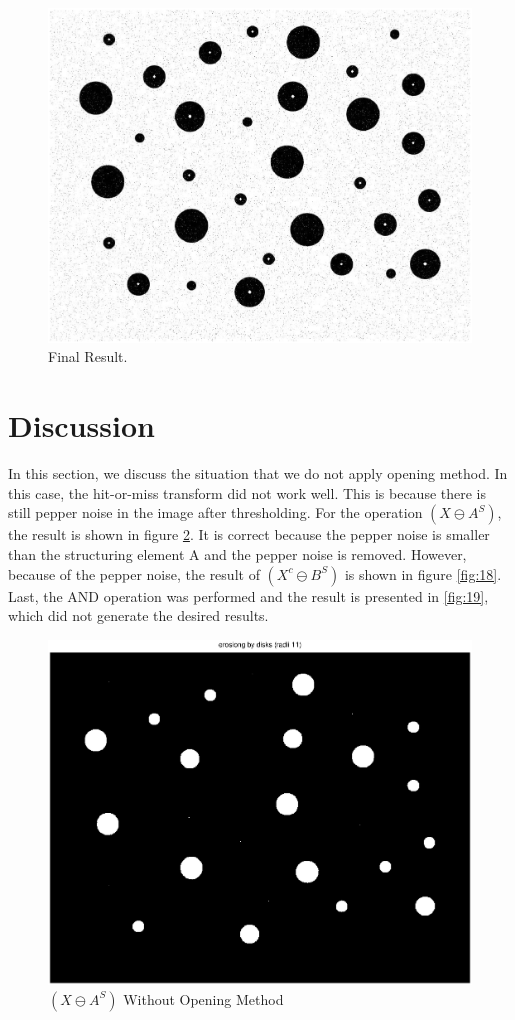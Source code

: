 \documentclass[paper=a4, fontsize=11pt]{scrartcl}
\begin{document}
\begin{figure}
	\centering
	\includegraphics[width=12cm]{Finalresult.eps}
	\caption{Final Result.}
	\label{fig:16}
\end{figure}


\section{Discussion}
In this section, we discuss the situation that we do not apply opening method. In this case, the hit-or-miss transform did not work well. This is because there is still pepper noise in the image after thresholding. For the operation $( X \ominus A^S)$, the result is shown in figure \ref{fig:17}. It is correct because the pepper noise is smaller than the structuring element A and the pepper noise is removed. However, because of the pepper noise, the result of $( X^c \ominus B^S)$ is shown in figure  \ref{fig:18}. Last, the AND operation was performed and the result is presented in \ref{fig:19}, which did not generate the desired results.
\begin{figure}
	\centering
	\includegraphics[width=12cm]{D_XsubAs.eps}
	\caption{ $( X \ominus A^S)$ Without Opening Method}
	\label{fig:17}
\end{figure}
\end{document}
